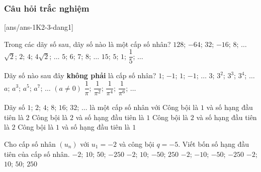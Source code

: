 \subsubsection{Câu hỏi trắc nghiệm}
[ans/ans-1K2-3-dang1]
\begin{ex}%
	Trong các dãy số sau, dãy số nào là một cấp số nhân?
	\choice
	{\True $128$; $-64$; $32$; $-16$; $8$; $\ldots$} 
	{$\sqrt{2}$; $2$; $4$; $4\sqrt{2}$; $\ldots$}
	{$5$; $6$; $7$; $8$; $\ldots$}
	{$15$; $5$; $1$; $\dfrac{1}{5}$; $\ldots$}
\end{ex}
\begin{ex}%
	Dãy số nào sau đây \textbf{không phải} là cấp số nhân?
	\choice
	{$1$; $-1$; $1$; $-1$; $\ldots$}
	{$3$; $3^2$; $3^3$; $3^4$; $\ldots$}
	{$a$; $a^3$; $a^5$; $a^7$; $\ldots$  $(a\not =0)$}
	{\True $\dfrac{1}{\pi}$; $\dfrac{1}{{\pi}^2}$; $\dfrac{1}{{\pi}^4}$; $\dfrac{1}{{\pi}^6}$; $\ldots$}
\end{ex}
\begin{ex}%
	Dãy số $1$; $2$; $4$; $8$; $16$; $32$; $\ldots$ là một cấp số nhân với 
	\choice
	{Công bội là $1$ và số hạng đầu tiên là $2$}
	{\True Công bội là $2$ và số hạng đầu tiên là $1$}
	{Công bội là $2$ và số hạng đầu tiên là $2$}
	{Công bội là $1$ và số hạng đầu tiên là $1$}
\end{ex}
\begin{ex}%
	Cho cấp số nhân $(u_n)$ với $u_1=-2$ và công bội $q=-5$. Viết bốn số hạng đầu tiên của cấp số nhân.
	\choice
	{$-2$; $10$; $50$; $-250$}
	{\True $-2$; $10$; $-50$; $250$}
	{$-2$; $-10$; $-50$; $-250$}
	{$-2$; $10$; $50$; $250$}
\end{ex}
